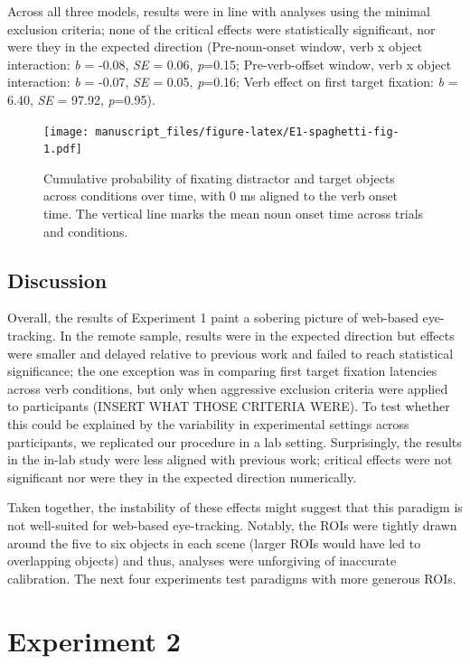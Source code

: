 \documentclass[
  man,floatsintext]{apa6}
\begin{document}
Across all three models, results were in line with analyses using the minimal exclusion criteria; none of the critical effects were statistically significant, nor were they in the expected direction (Pre-noun-onset window, verb x object interaction: \emph{b} = -0.08, \emph{SE} = 0.06, \emph{p}=0.15; Pre-verb-offset window, verb x object interaction: \emph{b} = -0.07, \emph{SE} = 0.05, \emph{p}=0.16; Verb effect on first target fixation: \emph{b} = 6.40, \emph{SE} = 97.92, \emph{p}=0.95).

\begin{figure}
\centering
\texttt{[image: manuscript\_files/figure-latex/E1-spaghetti-fig-1.pdf]}
\caption{\label{fig:E1-spaghetti-fig}Cumulative probability of fixating distractor and target objects across conditions over time, with 0 ms aligned to the verb onset time. The vertical line marks the mean noun onset time across trials and conditions.}
\end{figure}

\subsection{Discussion}\label{discussion}

Overall, the results of Experiment 1 paint a sobering picture of web-based eye-tracking. In the remote sample, results were in the expected direction but effects were smaller and delayed relative to previous work and failed to reach statistical significance; the one exception was in comparing first target fixation latencies across verb conditions, but only when aggressive exclusion criteria were applied to participants (INSERT WHAT THOSE CRITERIA WERE). To test whether this could be explained by the variability in experimental settings across participants, we replicated our procedure in a lab setting. Surprisingly, the results in the in-lab study were less aligned with previous work; critical effects were not significant nor were they in the expected direction numerically.

Taken together, the instability of these effects might suggest that this paradigm is not well-suited for web-based eye-tracking. Notably, the ROIs were tightly drawn around the five to six objects in each scene (larger ROIs would have led to overlapping objects) and thus, analyses were unforgiving of inaccurate calibration. The next four experiments test paradigms with more generous ROIs.

\section{Experiment 2}\label{experiment-2}
\end{document}
